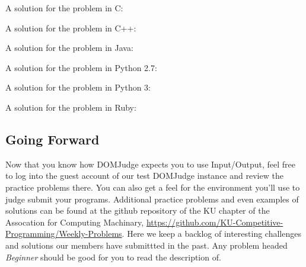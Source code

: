 \documentclass[a4paper]{article}
\begin{document}
A solution for the problem in C:

\newpage

A solution for the problem in C++:

\newpage

A solution for the problem in Java:

\newpage

A solution for the problem in Python 2.7:

\newpage

A solution for the problem in Python 3:

\newpage

A solution for the problem in Ruby:

\newpage

\subsection{Going Forward}
Now that you know how DOMJudge expects you to use Input/Output, feel free to log into the guest account of our test DOMJudge instance and review the practice problems there. You can also get a feel for the environment you'll use to judge submit your programs. Additional practice problems and even examples of solutions can be found at the github repository of the KU chapter of the Assocation for Computing Machinary, \url{https://github.com/KU-Competitive-Programming/Weekly-Problems}. Here we keep a backlog of interesting challenges and solutions our members have submittted in the past. Any problem headed \textit{Beginner} should be good for you to read the description of. 
\end{document}
